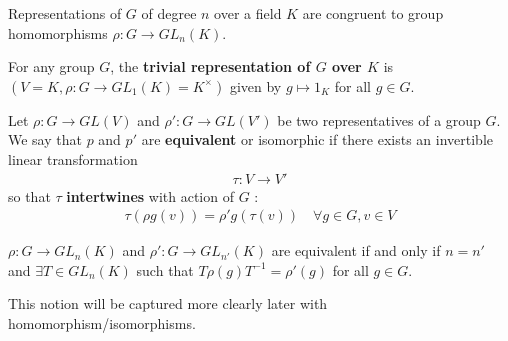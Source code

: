 \documentclass{memoir}
\begin{document}

Representations of \(G\) of degree \(n\) over a field \(K\) are congruent to group homomorphisms \(\rho:G\to GL_n(K)\).

\begin{defn}
	For any group \(G\), the \textbf{trivial representation of \(G\) over \(K\)} is \((V=K, \rho:G\to GL_1(K)=K^{\times })\) given by \(g\mapsto 1_K\) for all \(g \in G\).
\end{defn}


\begin{defn}
	Let \(\rho:G\to GL(V)\) and \(\rho':G\to GL(V')\) be two representatives of a group \(G\). We say that \(p\) and \(p'\) are \textbf{equivalent} or isomorphic if there exists an invertible linear transformation
	\begin{align*}
		\tau:V\to V'
	\end{align*}
	so that \(\tau\) \textbf{intertwines} with action of \(G\) :
	\begin{align*}
		\tau(\rho g(v)) = \rho'g(\tau(v)) \quad \forall g \in G, v \in V
	\end{align*}
\end{defn}

\begin{rmrk}
	\(\rho:G\to GL_n(K)\) and \(\rho':G\to GL_{n'}(K)\) are equivalent if and only if \(n = n'\) and \(\exists T \in GL_n(K)\) such that \(T\rho(g)T^{-1} = \rho'(g)\) for all \(g \in G\).
\end{rmrk}
This notion will be captured more clearly later with homomorphism/isomorphisms.
\end{document}
